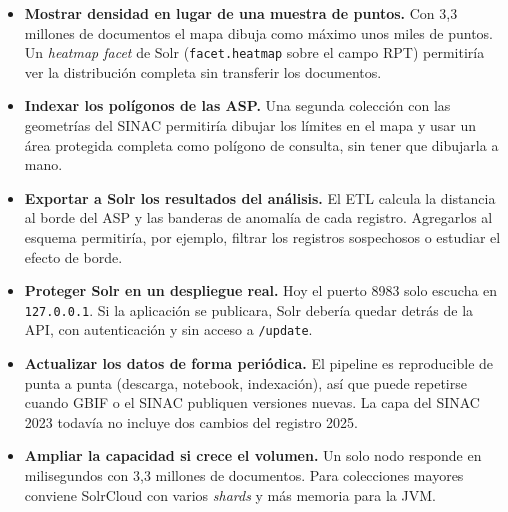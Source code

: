 \documentclass[11pt,a4paper]{article}
\newcommand{\cod}[1]{\texttt{#1}}
\begin{document}
\begin{itemize}
  \item \textbf{Mostrar densidad en lugar de una muestra de puntos.} Con 3,3 millones de
        documentos el mapa dibuja como máximo unos miles de puntos. Un \emph{heatmap facet} de
        Solr (\cod{facet.heatmap} sobre el campo RPT) permitiría ver la distribución completa
        sin transferir los documentos.
  \item \textbf{Indexar los polígonos de las ASP.} Una segunda colección con las geometrías
        del SINAC permitiría dibujar los límites en el mapa y usar un área protegida completa
        como polígono de consulta, sin tener que dibujarla a mano.
  \item \textbf{Exportar a Solr los resultados del análisis.} El ETL calcula la distancia al
        borde del ASP y las banderas de anomalía de cada registro. Agregarlos al esquema
        permitiría, por ejemplo, filtrar los registros sospechosos o estudiar el efecto de borde.
  \item \textbf{Proteger Solr en un despliegue real.} Hoy el puerto 8983 solo escucha en
        \cod{127.0.0.1}. Si la aplicación se publicara, Solr debería quedar detrás de la API,
        con autenticación y sin acceso a \cod{/update}.
  \item \textbf{Actualizar los datos de forma periódica.} El pipeline es reproducible de
        punta a punta (descarga, notebook, indexación), así que puede repetirse cuando GBIF o
        el SINAC publiquen versiones nuevas. La capa del SINAC 2023 todavía no incluye dos
        cambios del registro 2025.
  \item \textbf{Ampliar la capacidad si crece el volumen.} Un solo nodo responde en
        milisegundos con 3,3 millones de documentos. Para colecciones mayores conviene
        SolrCloud con varios \emph{shards} y más memoria para la JVM.
\end{itemize}
\end{document}

